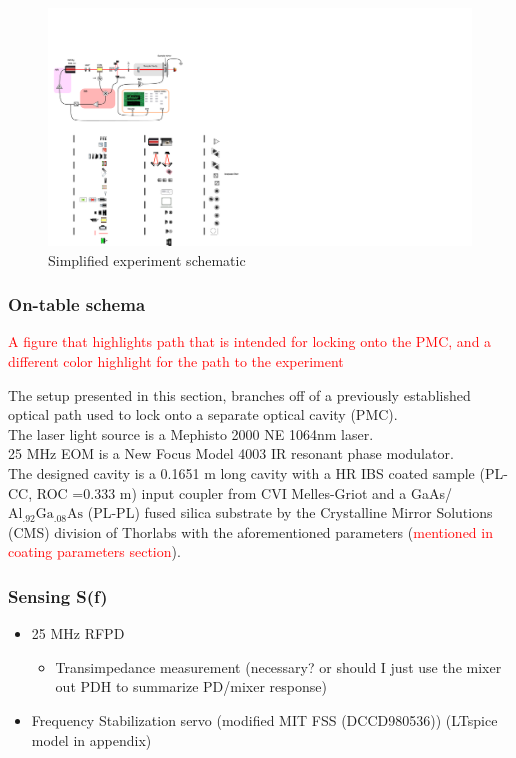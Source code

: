 \begin{figure}[H]
\includegraphics[width=\textwidth]{figs/ALGAAS/electrooptic_study_algaas_0.pdf}
\caption{Simplified experiment schematic}
\label{fig:poisson_output}
\end{figure}

\subsubsection{On-table schema}

\textcolor{red}{A figure that highlights path that is intended for locking onto the PMC, and a different color highlight for the path to the experiment}

The setup presented in this section, branches off of a previously established optical path used to lock onto a separate optical cavity (PMC).
\\
The laser light source is a Mephisto 2000 NE 1064nm laser.
\\
25 MHz EOM is a New Focus Model 4003 IR resonant phase modulator.
\\
The designed cavity is a 0.1651 m long cavity with a HR IBS coated sample (PL-CC, ROC =0.333 m) input coupler from CVI Melles-Griot and a GaAs/$\mathrm{Al_{.92}Ga_{.08}As}$ (PL-PL) fused silica substrate by the Crystalline Mirror Solutions (CMS) division of Thorlabs with the aforementioned parameters (\textcolor{red}{mentioned in coating parameters section}).

\subsubsection{Sensing S(f)}
\begin{itemize}
\item 25 MHz RFPD
\begin{itemize}
\item Transimpedance measurement (necessary? or should I just use the mixer out PDH to summarize PD/mixer response)
\end{itemize}
\item Frequency Stabilization servo (modified MIT FSS (DCCD980536)) (LTspice model in appendix)
\end{itemize}


